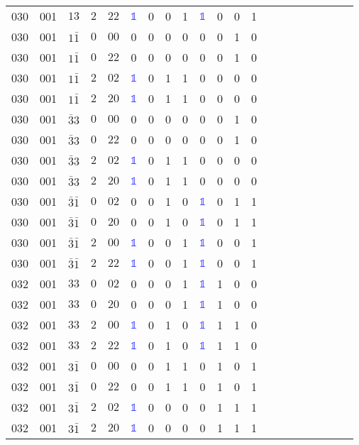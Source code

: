 \begin{longtable*}{c| cccccccccccccccccccc }
030& 001& $13$& $2$& $22$& \textcolor{blue}{$\mathds{1}$}& 0& 0& 1& \textcolor{blue}{$\mathds{1}$}& 0& 0& 1\\
030& 001& $1\bar{1}$& $0$& $00$& 0& 0& 0& 0& 0& 0& 1& 0\\
030& 001& $1\bar{1}$& $0$& $22$& 0& 0& 0& 0& 0& 0& 1& 0\\
030& 001& $1\bar{1}$& $2$& $02$& \textcolor{blue}{$\mathds{1}$}& 0& 1& 1& 0& 0& 0& 0\\
030& 001& $1\bar{1}$& $2$& $20$& \textcolor{blue}{$\mathds{1}$}& 0& 1& 1& 0& 0& 0& 0\\
030& 001& $\bar{3}3$& $0$& $00$& 0& 0& 0& 0& 0& 0& 1& 0\\
030& 001& $\bar{3}3$& $0$& $22$& 0& 0& 0& 0& 0& 0& 1& 0\\
030& 001& $\bar{3}3$& $2$& $02$& \textcolor{blue}{$\mathds{1}$}& 0& 1& 1& 0& 0& 0& 0\\
030& 001& $\bar{3}3$& $2$& $20$& \textcolor{blue}{$\mathds{1}$}& 0& 1& 1& 0& 0& 0& 0\\
030& 001& $\bar{3}\bar{1}$& $0$& $02$& 0& 0& 1& 0& \textcolor{blue}{$\mathds{1}$}& 0& 1& 1\\
030& 001& $\bar{3}\bar{1}$& $0$& $20$& 0& 0& 1& 0& \textcolor{blue}{$\mathds{1}$}& 0& 1& 1\\
030& 001& $\bar{3}\bar{1}$& $2$& $00$& \textcolor{blue}{$\mathds{1}$}& 0& 0& 1& \textcolor{blue}{$\mathds{1}$}& 0& 0& 1\\
030& 001& $\bar{3}\bar{1}$& $2$& $22$& \textcolor{blue}{$\mathds{1}$}& 0& 0& 1& \textcolor{blue}{$\mathds{1}$}& 0& 0& 1\\
032& 001& $33$& $0$& $02$& 0& 0& 0& 1& \textcolor{blue}{$\mathds{1}$}& 1& 0& 0\\
032& 001& $33$& $0$& $20$& 0& 0& 0& 1& \textcolor{blue}{$\mathds{1}$}& 1& 0& 0\\
032& 001& $33$& $2$& $00$& \textcolor{blue}{$\mathds{1}$}& 0& 1& 0& \textcolor{blue}{$\mathds{1}$}& 1& 1& 0\\
032& 001& $33$& $2$& $22$& \textcolor{blue}{$\mathds{1}$}& 0& 1& 0& \textcolor{blue}{$\mathds{1}$}& 1& 1& 0\\
032& 001& $3\bar{1}$& $0$& $00$& 0& 0& 1& 1& 0& 1& 0& 1\\
032& 001& $3\bar{1}$& $0$& $22$& 0& 0& 1& 1& 0& 1& 0& 1\\
032& 001& $3\bar{1}$& $2$& $02$& \textcolor{blue}{$\mathds{1}$}& 0& 0& 0& 0& 1& 1& 1\\
032& 001& $3\bar{1}$& $2$& $20$& \textcolor{blue}{$\mathds{1}$}& 0& 0& 0& 0& 1& 1& 1\\

\end{longtable*}
